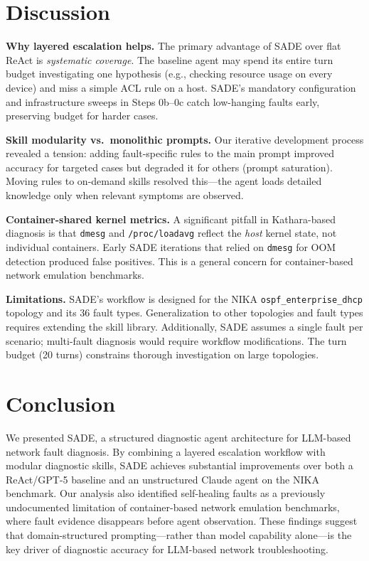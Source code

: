 \documentclass[conference]{IEEEtran}
\begin{document}
\section{Discussion}

\textbf{Why layered escalation helps.}
The primary advantage of SADE over flat ReAct is \emph{systematic coverage}. The baseline agent may spend its entire turn budget investigating one hypothesis (e.g., checking resource usage on every device) and miss a simple ACL rule on a host. SADE's mandatory configuration and infrastructure sweeps in Steps 0b--0c catch low-hanging faults early, preserving budget for harder cases.

\textbf{Skill modularity vs.\ monolithic prompts.}
Our iterative development process revealed a tension: adding fault-specific rules to the main prompt improved accuracy for targeted cases but degraded it for others (prompt saturation). Moving rules to on-demand skills resolved this---the agent loads detailed knowledge only when relevant symptoms are observed.

\textbf{Container-shared kernel metrics.}
A significant pitfall in Kathara-based diagnosis is that \texttt{dmesg} and \texttt{/proc/loadavg} reflect the \emph{host} kernel state, not individual containers. Early SADE iterations that relied on \texttt{dmesg} for OOM detection produced false positives. This is a general concern for container-based network emulation benchmarks.

\textbf{Limitations.}
SADE's workflow is designed for the NIKA \texttt{ospf\_enterprise\_dhcp} topology and its 36 fault types. Generalization to other topologies and fault types requires extending the skill library. Additionally, SADE assumes a single fault per scenario; multi-fault diagnosis would require workflow modifications. The turn budget (20 turns) constrains thorough investigation on large topologies.

\section{Conclusion}

We presented SADE, a structured diagnostic agent architecture for LLM-based network fault diagnosis. By combining a layered escalation workflow with modular diagnostic skills, SADE achieves substantial improvements over both a ReAct/GPT-5 baseline and an unstructured Claude agent on the NIKA benchmark. Our analysis also identified self-healing faults as a previously undocumented limitation of container-based network emulation benchmarks, where fault evidence disappears before agent observation. These findings suggest that domain-structured prompting---rather than model capability alone---is the key driver of diagnostic accuracy for LLM-based network troubleshooting.
\end{document}

